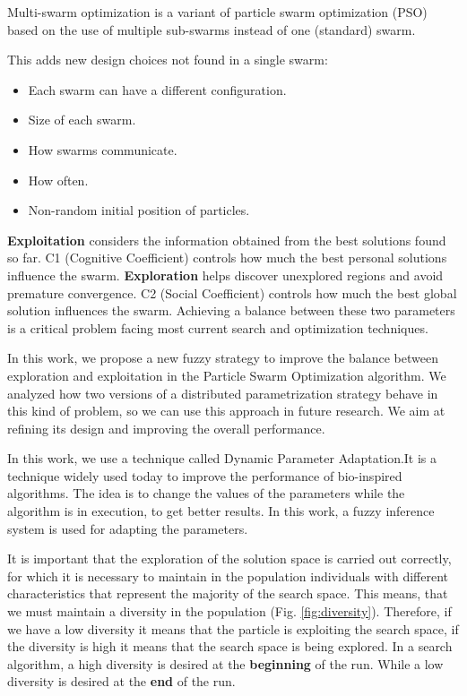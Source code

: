 \documentclass[runningheads]{llncs}
\begin{document}
Multi-swarm optimization is a variant of particle swarm optimization (PSO) based on the use of multiple sub-swarms instead of one (standard) swarm.

This adds new design choices not found in a single swarm:

\begin{itemize}
    \item Each swarm can have a different configuration.
    \item Size of each swarm.
    \item How swarms communicate.
    \item How often.
    \item Non-random initial position of particles.
\end{itemize}

\textbf{Exploitation} considers the information obtained from the best solutions found so far.  
C1 (Cognitive Coefficient) controls how much the best personal  solutions influence the swarm. 
\textbf{Exploration} helps discover unexplored regions and avoid premature convergence. 
C2 (Social Coefficient) controls how much the best global solution influences the swarm.
Achieving a balance between these two parameters is a critical problem facing most current search and optimization techniques. 

In this work, we propose a new fuzzy strategy to improve the balance between exploration and exploitation in the Particle Swarm Optimization algorithm. We analyzed how two versions of a distributed parametrization strategy behave in this kind of problem, so we can use this approach in future research. We aim at refining its design and improving the overall performance.

In this work, we use a technique called Dynamic Parameter Adaptation.It is a technique widely used today to improve the performance of bio-inspired algorithms. The idea is to change the values of the parameters while the algorithm is in execution, to get better results. In this work, a fuzzy inference system is used for adapting the parameters.

It is important that the exploration of the solution space is carried out correctly, for which it is necessary to maintain in the population individuals with different characteristics that represent the majority of the search space.  This means, that we must maintain a diversity in the population (Fig.  \ref{fig:diversity}). Therefore, if we have a low diversity it means that the particle is exploiting the search space, if the diversity is high it means that the search space is being explored. In a search algorithm, a high diversity is desired at the \textbf{beginning} of the run. While a low diversity is desired at the \textbf{end} of the run.
\end{document}
